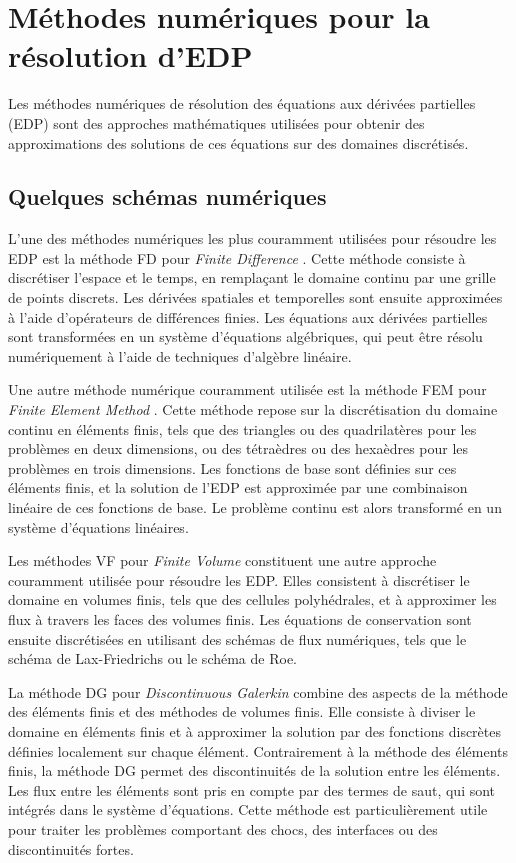 \section{Méthodes numériques pour la résolution d'EDP}

Les méthodes numériques de résolution des équations aux dérivées partielles (EDP) sont des approches mathématiques utilisées pour obtenir des approximations des solutions de ces équations sur des domaines discrétisés.

\subsection{Quelques schémas numériques}

L'une des méthodes numériques les plus couramment utilisées pour résoudre les EDP est la méthode FD pour \emph{Finite Difference} \cite{forsythe1961finite, smith1985numerical, stummel2006difference}. Cette méthode consiste à discrétiser l'espace et le temps, en remplaçant le domaine continu par une grille de points discrets. Les dérivées spatiales et temporelles sont ensuite approximées à l'aide d'opérateurs de différences finies. Les équations aux dérivées partielles sont transformées en un système d'équations algébriques, qui peut être résolu numériquement à l'aide de techniques d'algèbre linéaire.

Une autre méthode numérique couramment utilisée est la méthode FEM pour \emph{Finite Element Method} \cite{zienkiewicz2005finite, norrie2014finite}. Cette méthode repose sur la discrétisation du domaine continu en éléments finis, tels que des triangles ou des quadrilatères pour les problèmes en deux dimensions, ou des tétraèdres ou des hexaèdres pour les problèmes en trois dimensions. Les fonctions de base sont définies sur ces éléments finis, et la solution de l'EDP est approximée par une combinaison linéaire de ces fonctions de base. Le problème continu est alors transformé en un système d'équations linéaires.

Les méthodes VF pour \emph{Finite Volume} \cite{leveque2002finite, barth2003finite} constituent une autre approche couramment utilisée pour résoudre les EDP. Elles consistent à discrétiser le domaine en volumes finis, tels que des cellules polyhédrales, et à approximer les flux à travers les faces des volumes finis. Les équations de conservation sont ensuite discrétisées en utilisant des schémas de flux numériques, tels que le schéma de Lax-Friedrichs ou le schéma de Roe.

La méthode DG pour \emph{Discontinuous Galerkin} \cite{arnold2000discontinuous, riviere2008discontinuous} combine des aspects de la méthode des éléments finis et des méthodes de volumes finis. Elle consiste à diviser le domaine en éléments finis et à approximer la solution par des fonctions discrètes définies localement sur chaque élément. Contrairement à la méthode des éléments finis, la méthode DG permet des discontinuités de la solution entre les éléments. Les flux entre les éléments sont pris en compte par des termes de saut, qui sont intégrés dans le système d'équations. Cette méthode est particulièrement utile pour traiter les problèmes comportant des chocs, des interfaces ou des discontinuités fortes.

